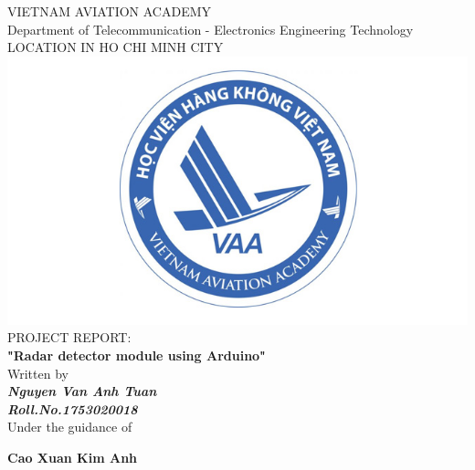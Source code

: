\documentclass[a4paper]{report}
\begin{document}
    \centering
    \LARGE{\textsc{VIETNAM AVIATION ACADEMY}}\\
    \vspace{3mm}
    \normalsize{Department of Telecommunication - Electronics Engineering Technology} \\
    \vspace{3mm}
    \large{LOCATION IN HO CHI MINH CITY} \\
    \vspace{3mm}
    \includegraphics[scale=0.3]{logo.jpg} \\
    \vspace{3mm}
    \normalsize{PROJECT REPORT: } \\ 
    \vspace{15mm}
    \huge{\textbf{"Radar detector module using Arduino"}} \\
    \vspace{20mm}
    \normalsize{Written by} \\
    \vspace{3mm}
    \large{\textbf{\textit{Nguyen Van Anh Tuan}}} \\
    \vspace{3mm}
    \textbf{{\large{\textit{Roll.No.1753020018}}}} \\
    \vspace{15mm}
    \large{Under the guidance of} \\ 
    \vspace{10mm}
    \centerline{\textbf{\large{Cao Xuan Kim Anh}}}
    
    \pagestyle{fancy}
    \fancyhf{}
    \cfoot{\today}
    \renewcommand{\headrulewidth}{2pt}
    \renewcommand{\footrulewidth}{1pt}
\end{document}

